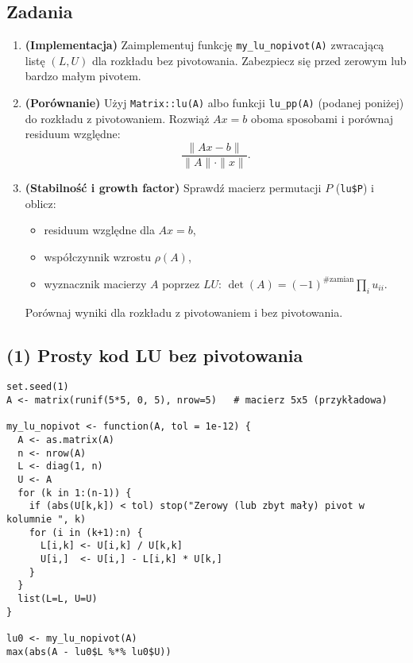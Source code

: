 \documentclass[12pt]{article}
\begin{document}
\subsection*{Zadania}

\begin{enumerate}[label=\textbf{Z\arabic*}.]

\item \textbf{(Implementacja)} 
Zaimplementuj funkcję \texttt{my\_lu\_nopivot(A)} zwracającą listę $(L,U)$ dla rozkładu bez pivotowania. 
Zabezpiecz się przed zerowym lub bardzo małym pivotem.

\item \textbf{(Porównanie)} 
Użyj \texttt{Matrix::lu(A)} albo funkcji \texttt{lu\_pp(A)} (podanej poniżej) do rozkładu z pivotowaniem. 
Rozwiąż $Ax=b$ oboma sposobami i porównaj residuum względne:
\[
\frac{\|Ax-b\|}{\|A\|\cdot \|x\|}.
\]

\item \textbf{(Stabilność i growth factor)} 
Sprawdź macierz permutacji $P$ (\texttt{lu\$P}) i oblicz:
\begin{itemize}
  \item residuum względne dla $Ax=b$, 
  \item współczynnik wzrostu $\rho(A)$,
  \item wyznacznik macierzy $A$ poprzez $LU$: 
  $\det(A)=(-1)^{\#\text{zamian}}\prod_i u_{ii}$.
\end{itemize}
Porównaj wyniki dla rozkładu z pivotowaniem i bez pivotowania.

\end{enumerate}

\subsection*{(1) Prosty kod LU bez pivotowania}
\begin{lstlisting}
set.seed(1)
A <- matrix(runif(5*5, 0, 5), nrow=5)   # macierz 5x5 (przykładowa)

my_lu_nopivot <- function(A, tol = 1e-12) {
  A <- as.matrix(A)
  n <- nrow(A)
  L <- diag(1, n)
  U <- A
  for (k in 1:(n-1)) {
    if (abs(U[k,k]) < tol) stop("Zerowy (lub zbyt mały) pivot w kolumnie ", k)
    for (i in (k+1):n) {
      L[i,k] <- U[i,k] / U[k,k]
      U[i,]  <- U[i,] - L[i,k] * U[k,]
    }
  }
  list(L=L, U=U)
}

lu0 <- my_lu_nopivot(A)
max(abs(A - lu0$L %*% lu0$U))
\end{lstlisting}
\end{document}

